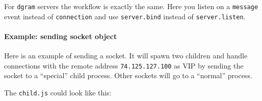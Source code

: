 For \texttt{dgram} servers the workflow is exactly the same. Here you
listen on a \texttt{message} event instead of \texttt{connection} and
use \texttt{server.bind} instead of \texttt{server.listen}.

\paragraph{Example: sending socket object}

Here is an example of sending a socket. It will spawn two children and
handle connections with the remote address \texttt{74.125.127.100} as
VIP by sending the socket to a ``special'' child process. Other sockets
will go to a ``normal'' process.

\begin{Shaded}
\begin{Highlighting}[]
 \NormalTok{(}\NormalTok{, [}\NormalTok{]);}
 \NormalTok{(}\NormalTok{, [}\NormalTok{]);}

 \NormalTok{();}
\NormalTok{(}\NormalTok{, } 

   \NormalTok{(} \NormalTok{=== }\NormalTok{) \{}
    \NormalTok{(}
    \NormalTok{;}
  \NormalTok{\}}
  \NormalTok{(}
\NormalTok{\});}
\NormalTok{(}\NormalTok{);}
\end{Highlighting}
\end{Shaded}

The \texttt{child.js} could look like this:

\begin{Shaded}
\begin{Highlighting}[]
\NormalTok{(}\NormalTok{, }
   \NormalTok{) \{}
    \NormalTok{(} \NormalTok{+ }\NormalTok{[}\NormalTok{] + }\NormalTok{);}
  \NormalTok{\}}
\NormalTok{\});}
\end{Highlighting}
\end{Shaded}

